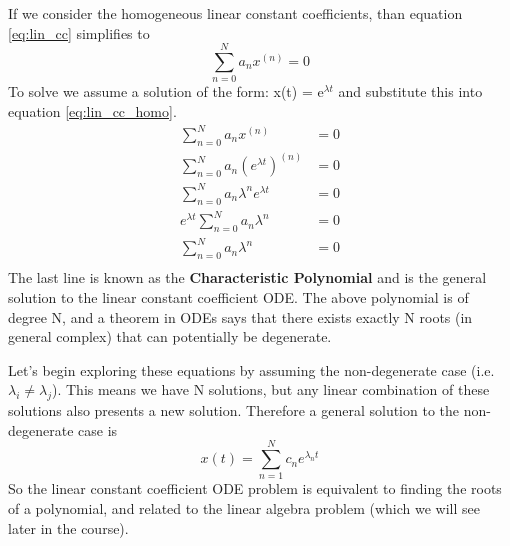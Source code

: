 \documentclass{article}
\newcommand{\be}{\begin{equation}}
\newcommand{\ee}{\end{equation}}
\begin{document}
If we consider the homogeneous linear constant coefficients, than equation \ref{eq:lin_cc} simplifies to
\be \label{eq:lin_cc_homo}
\sum_{n=0}^N a_nx^{(n)} = 0
\ee
To solve we assume a solution of the form: x(t) = e$^{\lambda t}$ and substitute this into equation \ref{eq:lin_cc_homo}.
\be
\begin{split}
    \sum_{n=0}^N a_nx^{(n)} &= 0\\
    \sum_{n=0}^N a_n \left(e^{\lambda t}\right) ^{(n)} &= 0\\
    \sum_{n=0}^N a_n \lambda^n e^{\lambda t} &= 0\\
    e^{\lambda t} \sum_{n=0}^N a_n \lambda^n &= 0\\
    \sum_{n=0}^N a_n \lambda^n &= 0\\
\end{split}
\ee
The last line is known as the \textbf{Characteristic Polynomial} and is the general solution to the linear constant coefficient ODE.
The above polynomial is of degree N, and a theorem in  ODEs says that there exists exactly N roots (in general complex) that can potentially be degenerate.

Let's begin exploring these equations by assuming the non-degenerate case (i.e. $\lambda_i \neq \lambda_j$).
This means we have N solutions, but any linear combination of these solutions also presents a new solution.
Therefore a general solution to the non-degenerate case is
\be
x(t) = \sum_{n=1}^N c_n e^{\lambda_nt}
\ee
So the linear constant coefficient ODE problem is equivalent to finding the roots of a polynomial, and related to the linear algebra problem (which we will see later in the course).
\end{document}
